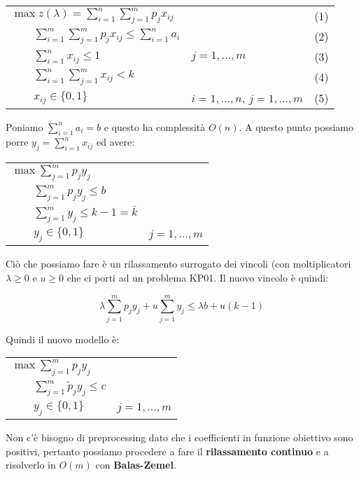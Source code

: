 \documentclass[11pt]{book}
\begin{document}
\begin{center}
\begin{tabular}{lll}
$\max z(\lambda) = \sum\limits_{i=1}^n \sum\limits_{j=1}^m p_j x_{ij}$ & & (1)\\
$\qquad \sum\limits_{i=1}^m\sum\limits_{j=1}^m p_j x_{ij} \leq
\sum\limits_{i=1}^n a_i$ & & (2) \\
$\qquad \sum\limits_{i=1}^n x_{ij} \leq 1$ & $j=1,\dots,m$ & (3) \\
$\qquad \sum\limits_{i=1}^n\sum\limits_{j=1}^m x_{ij} < k$ & & (4) \\
$\qquad x_{ij} \in \{0, 1 \}$ & $i=1,\dots,n$, $j=1,\dots,m$ & (5) \\
\end{tabular}
\end{center}

Poniamo $\sum_{i=1}^n a_i = b$ e questo ha complessit\`a $O(n)$. A
questo punto possiamo porre $y_j = \sum\limits_{i=1}^n x_{ij} $ ed
avere:

\begin{center}
\begin{tabular}{ll}
$\max \sum\limits_{j=1}^m p_jy_j$\\
$\qquad \sum\limits_{j=1}^m p_j y_j \leq b$ \\
$\qquad \sum\limits_{j=1}^m y_j \leq k-1 = \bar{k}$ \\
$\qquad y_j \in \{0,1\}$ & $j=1,\dots,m$
\end{tabular}
\end{center}

Ci\`o che possiamo fare \`e un rilassamento surrogato dei vincoli (con
moltiplicatori $\lambda \geq 0$ e $u \geq 0$ che ci porti ad un
problema KP01. Il nuovo vincolo \`e quindi:

$$
\lambda \sum\limits_{j=1}^m p_jy_j + u \sum\limits_{j=1}^m y_j \leq
\lambda b + u (k -1)
$$

Quindi il nuovo modello \`e:

\begin{center}
\begin{tabular}{ll}
$\max \sum\limits_{j=1}^m p_jy_j$\\
$\qquad \sum\limits_{j=1}^m \tilde{p}_j y_j \leq c$ \\
$\qquad y_j \in \{0,1\}$ & $j=1,\dots,m$
\end{tabular}
\end{center}

Non c'\`e bisogno di preprocessing dato che i coefficienti in funzione
obiettivo sono positivi, pertanto possiamo procedere a fare il
\textbf{rilassamento continuo} e a risolverlo in $O(m)$ con
\textbf{Balas-Zemel}.
\end{document}
